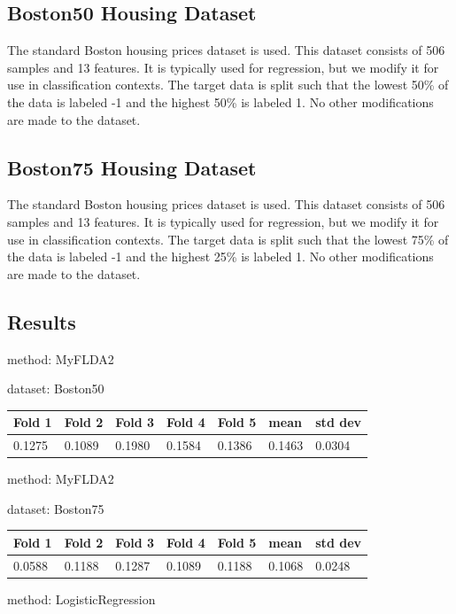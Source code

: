 \documentclass{article}
\begin{document}
\subsection{Boston50 Housing Dataset}

The standard Boston housing prices dataset is used.  This dataset consists of 506 samples and 13 features.  It is typically used for regression, but we modify it for use in classification contexts.  The target data is split such that the lowest 50\% of the data is labeled -1 and the highest 50\% is labeled 1.  No other modifications are made to the dataset.

\subsection{Boston75 Housing Dataset}

The standard Boston housing prices dataset is used.  This dataset consists of 506 samples and 13 features.  It is typically used for regression, but we modify it for use in classification contexts.  The target data is split such that the lowest 75\% of the data is labeled -1 and the highest 25\% is labeled 1.  No other modifications are made to the dataset.

\subsection{Results}

\noindent method: MyFLDA2

\noindent dataset: Boston50

\begin{center}
	\begin{tabular}  { | l | l | l | l | l | l | l | }
	\hline
	Fold 1 & Fold 2 & Fold 3 & Fold 4 & Fold 5 & mean & std dev\\ \hline
	0.1275 & 0.1089 & 0.1980 & 0.1584 & 0.1386 & 0.1463 & 0.0304\\
	\hline
	\end{tabular}
\end{center}
\noindent method: MyFLDA2

\noindent dataset: Boston75

\begin{center}
	\begin{tabular}  { | l | l | l | l | l | l | l | }
	\hline
	Fold 1 & Fold 2 & Fold 3 & Fold 4 & Fold 5 & mean & std dev\\ \hline
	0.0588 & 0.1188 & 0.1287 & 0.1089 & 0.1188 & 0.1068 & 0.0248\\
	\hline
	\end{tabular}
\end{center}
\noindent method: LogisticRegression
\end{document}
